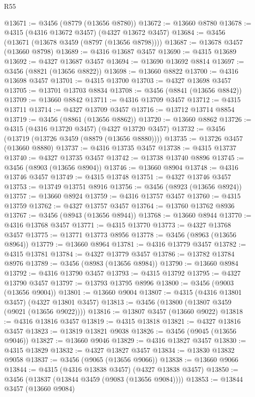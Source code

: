 \begin{lexlean}{R55}
\begin{coremodule}
@13671 := @3456 (@8779 (@13656 @8780))
@13672 := @13660 @8780
@13678 := @4315 (@4316 @13672 @3457) (@4327 @13672 @3457)
@13684 := @3456 (@13671 (@13678 @3459 (@8797 (@13656 @8798))))
@13687 := @13678 @3457 (@13660 @8798)
@13689 := @4316 @13687 @3457
@13690 := @4315 @13689
@13692 := @4327 @13687 @3457
@13694 := @13690 @13692 @8814
@13697 := @3456 (@8821 (@13656 @8822))
@13698 := @13660 @8822
@13700 := @4316 @13698 @3457
@13701 := @4315 @13700
@13703 := @4327 @13698 @3457
@13705 := @13701 @13703 @8834
@13708 := @3456 (@8841 (@13656 @8842))
@13709 := @13660 @8842
@13711 := @4316 @13709 @3457
@13712 := @4315 @13711
@13714 := @4327 @13709 @3457
@13716 := @13712 @13714 @8854
@13719 := @3456 (@8861 (@13656 @8862))
@13720 := @13660 @8862
@13726 := @4315 (@4316 @13720 @3457) (@4327 @13720 @3457)
@13732 := @3456 (@13719 (@13726 @3459 (@8879 (@13656 @8880))))
@13735 := @13726 @3457 (@13660 @8880)
@13737 := @4316 @13735 @3457
@13738 := @4315 @13737
@13740 := @4327 @13735 @3457
@13742 := @13738 @13740 @8896
@13745 := @3456 (@8903 (@13656 @8904))
@13746 := @13660 @8904
@13748 := @4316 @13746 @3457
@13749 := @4315 @13748
@13751 := @4327 @13746 @3457
@13753 := @13749 @13751 @8916
@13756 := @3456 (@8923 (@13656 @8924))
@13757 := @13660 @8924
@13759 := @4316 @13757 @3457
@13760 := @4315 @13759
@13762 := @4327 @13757 @3457
@13764 := @13760 @13762 @8936
@13767 := @3456 (@8943 (@13656 @8944))
@13768 := @13660 @8944
@13770 := @4316 @13768 @3457
@13771 := @4315 @13770
@13773 := @4327 @13768 @3457
@13775 := @13771 @13773 @8956
@13778 := @3456 (@8963 (@13656 @8964))
@13779 := @13660 @8964
@13781 := @4316 @13779 @3457
@13782 := @4315 @13781
@13784 := @4327 @13779 @3457
@13786 := @13782 @13784 @8976
@13789 := @3456 (@8983 (@13656 @8984))
@13790 := @13660 @8984
@13792 := @4316 @13790 @3457
@13793 := @4315 @13792
@13795 := @4327 @13790 @3457
@13797 := @13793 @13795 @8996
@13800 := @3456 (@9003 (@13656 @9004))
@13801 := @13660 @9004
@13807 := @4315 (@4316 @13801 @3457) (@4327 @13801 @3457)
@13813 := @3456 (@13800 (@13807 @3459 (@9021 (@13656 @9022))))
@13816 := @13807 @3457 (@13660 @9022)
@13818 := @4316 @13816 @3457
@13819 := @4315 @13818
@13821 := @4327 @13816 @3457
@13823 := @13819 @13821 @9038
@13826 := @3456 (@9045 (@13656 @9046))
@13827 := @13660 @9046
@13829 := @4316 @13827 @3457
@13830 := @4315 @13829
@13832 := @4327 @13827 @3457
@13834 := @13830 @13832 @9058
@13837 := @3456 (@9065 (@13656 @9066))
@13838 := @13660 @9066
@13844 := @4315 (@4316 @13838 @3457) (@4327 @13838 @3457)
@13850 := @3456 (@13837 (@13844 @3459 (@9083 (@13656 @9084))))
@13853 := @13844 @3457 (@13660 @9084)

\end{coremodule}
\end{lexlean}
